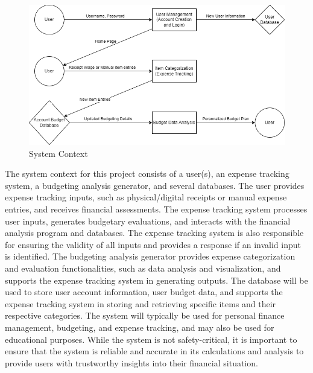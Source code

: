 \documentclass[12pt]{article}
\begin{document}
\begin{figure}[h!]
  \centering
   \includegraphics[width=\textwidth]{SystemContext.png}
  \caption{System Context}
  \label{Fig_SystemContext} 
\end{figure}

The system context for this project consists of a user(s), an expense tracking system, 
a budgeting analysis generator, and several databases. The user provides expense 
tracking inputs, such as physical/digital receipts or manual expense entries, and 
receives financial assessments. The expense tracking system processes user inputs, 
generates budgetary evaluations, and interacts with the financial analysis program 
and databases. The expense tracking system is also responsible for ensuring the 
validity of all inputs and provides a response if an invalid input is identified. 
The budgeting analysis generator provides expense categorization and evaluation 
functionalities, such as data analysis and visualization, and supports the expense 
tracking system in generating outputs. The database will be used to store user 
account information, user budget data, and supports the expense tracking system 
in storing and retrieving specific items and their respective categories. 
The system will typically be used for personal finance management, budgeting, 
and expense tracking, and may also be used for educational purposes. While 
the system is not safety-critical, it is important to ensure that the system is 
reliable and accurate in its calculations and analysis to provide users with 
trustworthy insights into their financial situation.
\end{document}
